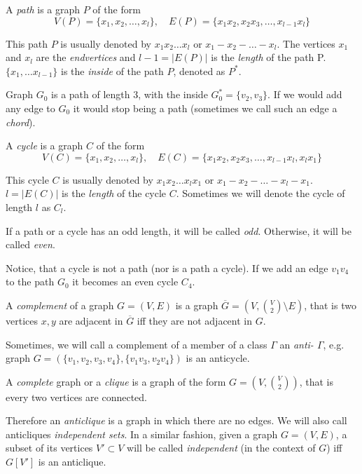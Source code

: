 \begin{defn}[path]
  A \emph{path} is a graph $P$ of the form
  \[ V(P) = \{x_1, x_2, \ldots, x_l\},\quad E(P) = \{x_1x_2, x_2x_3, \ldots, x_{l-1}x_l\} \]
\end{defn}
This path $P$ is usually denoted by $x_1x_2\ldots x_l$ or $x_1 - x_2 - \ldots - x_l$. The vertices $x_1$ and $x_l$ are the \emph{endvertices} and ${l-1} = |E(P)|$ is the \emph{length} of the path P. $\{x_1, \ldots x_{l-1}\}$ is the \emph{inside} of the path $P$, denoted as $P^*$.

Graph $G_0$ is a path of length 3, with the inside $G_0^* = \{v_2, v_3\}$. If we would add any edge to $G_0$ it would stop being a path (sometimes we call such an edge a \emph{chord}).

\begin{defn}[cycle]
  A \emph{cycle} is a graph $C$ of the form
  \[ V(C) = \{x_1, x_2, \ldots, x_l\},\quad E(C) = \{x_1x_2, x_2x_3, \ldots, x_{l-1}x_l, x_lx_1\} \]
\end{defn}

This cycle $C$ is usually denoted by $x_1x_2\ldots x_lx_1$ or $x_1 - x_2 - \ldots - x_l - x_1$. $l = |E(C)|$ is the \emph{length} of the cycle $C$. Sometimes we will denote the cycle of length $l$ as $C_l$.

If a path or a cycle has an odd length, it will be called \emph{odd}. Otherwise, it will be called \emph{even}.

Notice, that a cycle is not a path (nor is a path a cycle). If we add an edge $v_1v_4$ to the path $G_0$ it becomes an even cycle $C_4$.

\begin{defn}[complement]
  A \emph{complement} of a graph $G = (V, E)$ is a graph $\overline{G} = (V, {V \choose 2} \setminus E)$, that is two vertices $x, y$ are adjacent in $\overline{G}$ iff they are not adjacent in $G$.
\end{defn}

Sometimes, we will call a complement of a member of a class $\Gamma$ an \emph{anti-
$\Gamma$}, e.g. graph $G = (\{v_1, v_2, v_3, v_4\}, \{v_1v_3, v_2v_4\})$ is an anticycle.

\begin{defn}[clique]
  A \emph{complete} graph or a \emph{clique} is a graph of the form $G = (V, {V \choose 2})$, that is every two vertices are connected.
\end{defn}

Therefore an \emph{anticlique} is a graph in which there are no edges. We will also call anticliques \emph{independent sets}. In a similar fashion, given a graph $G = (V, E)$, a subset of its vertices $V' \subset V$ will be called \emph{independent} (in the context of $G$) iff $G[V']$ is an anticlique.

